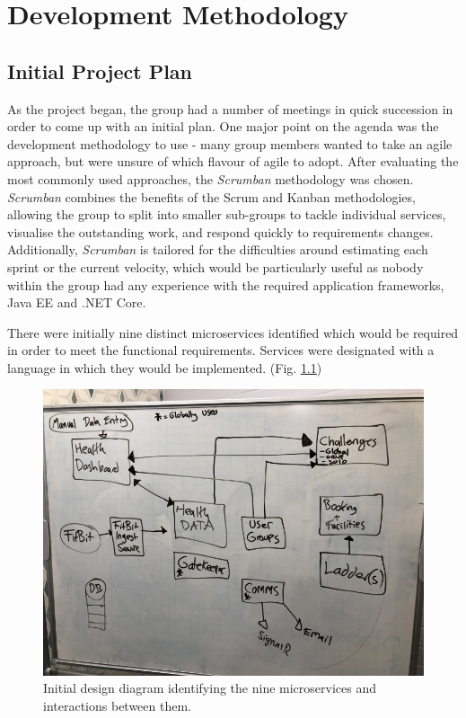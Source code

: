 \chapter{Development Methodology}

\section{Initial Project Plan}
As the project began, the group had a number of meetings in quick succession in order to come up with an initial plan.  One major point on the agenda was the development methodology to use - many group members wanted to take an agile approach, but were unsure of which flavour of agile to adopt.  After evaluating the most commonly used approaches, the \textit{Scrumban}\cite{scrumban} methodology was chosen.  \textit{Scrumban} combines the benefits of the Scrum and Kanban methodologies, allowing the group to split into smaller sub-groups to tackle individual services, visualise the outstanding work, and respond quickly to requirements changes. Additionally, \textit{Scrumban} is tailored for the difficulties around estimating each sprint or the current velocity, which would be particularly useful as nobody within the group had any experience with the required application frameworks, Java EE and .NET Core. 

There were initially nine distinct microservices identified which would be required in order to meet the functional requirements.  Services were designated with a language in which they would be implemented. (Fig. \ref{fig:initial_spec_chart})

\begin{figure}[H]
    \centering
    \includegraphics[width=\textwidth]{Images/Initial_Spec_Chart.jpg}
    \caption{Initial design diagram identifying the nine microservices and interactions between them.}
    \label{fig:initial_spec_chart}
\end{figure}

